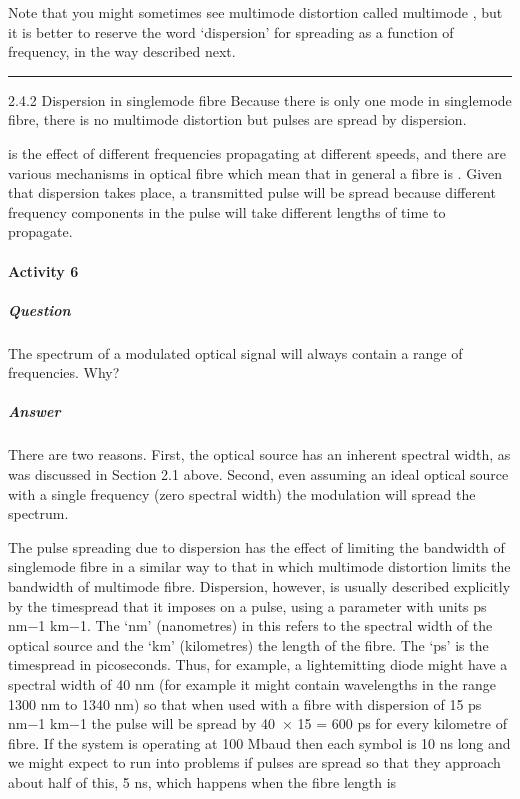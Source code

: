 \documentclass[letterpaper,10pt,english]{sphinxmanual}
\begin{document}
Note that you might sometimes see multimode distortion called multimode , but it is better to reserve the word ‘dispersion’ for spreading as a function of frequency, in the way described next.


\bigskip\hrule\bigskip


2.4.2 Dispersion in single\sphinxhyphen{}mode fibre Because there is only one mode in single\sphinxhyphen{}mode fibre, there is no multimode distortion but pulses are spread by dispersion.

 is the effect of different frequencies propagating at different speeds, and there are various mechanisms in optical fibre which mean that in general a fibre is . Given that dispersion takes place, a transmitted pulse will be spread because different frequency components in the pulse will take different lengths of time to propagate.


\paragraph{Activity 6}
\label{\detokenize{content/session_00/Part_00_02:Activity-6}}

\subparagraph{Question}
\label{\detokenize{content/session_00/Part_00_02:id17}}
The spectrum of a modulated optical signal will always contain a range of frequencies. Why?


\subparagraph{Answer}
\label{\detokenize{content/session_00/Part_00_02:id18}}
There are two reasons. First, the optical source has an inherent spectral width, as was discussed in Section 2.1 above. Second, even assuming an ideal optical source with a single frequency (zero spectral width) the modulation will spread the spectrum.

The pulse spreading due to dispersion has the effect of limiting the bandwidth of single\sphinxhyphen{}mode fibre in a similar way to that in which multimode distortion limits the bandwidth of multimode fibre. Dispersion, however, is usually described explicitly by the time\sphinxhyphen{}spread that it imposes on a pulse, using a parameter with units ps nm−1 km−1. The ‘nm’ (nanometres) in this refers to the spectral width of the optical source and the ‘km’ (kilometres) the length of the fibre. The ‘ps’ is the time\sphinxhyphen{}spread
in picoseconds. Thus, for example, a light\sphinxhyphen{}emitting diode might have a spectral width of 40 nm (for example it might contain wavelengths in the range 1300 nm to 1340 nm) so that when used with a fibre with dispersion of 15 ps nm−1 km−1 the pulse will be spread by 40 × 15 = 600 ps for every kilometre of fibre. If the system is operating at 100 Mbaud then each symbol is 10 ns long and we might expect to run into problems if pulses are spread so that they approach about half of this, 5 ns, which
happens when the fibre length is
\end{document}
